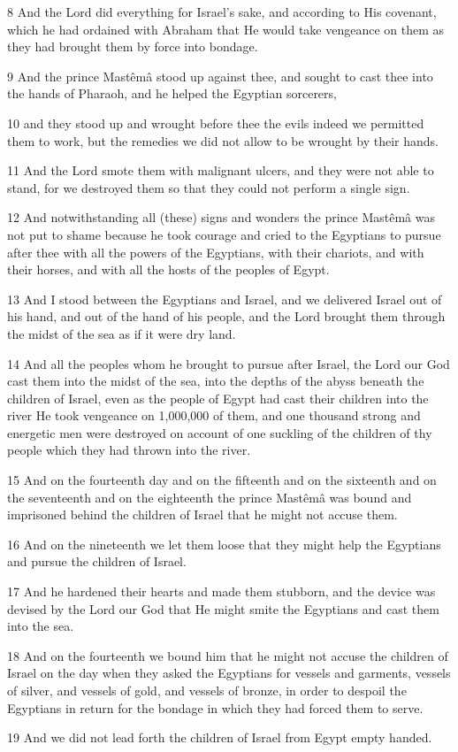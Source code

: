 \par 8 And the Lord did everything for Israel's sake, and according to His covenant, which he had ordained with Abraham that He would take vengeance on them as they had brought them by force into bondage.
\par 9 And the prince Mastêmâ stood up against thee, and sought to cast thee into the hands of Pharaoh, and he helped the Egyptian sorcerers,
\par 10 and they stood up and wrought before thee the evils indeed we permitted them to work, but the remedies we did not allow to be wrought by their hands.
\par 11 And the Lord smote them with malignant ulcers, and they were not able to stand, for we destroyed them so that they could not perform a single sign.
\par 12 And notwithstanding all (these) signs and wonders the prince Mastêmâ was not put to shame because he took courage and cried to the Egyptians to pursue after thee with all the powers of the Egyptians, with their chariots, and with their horses, and with all the hosts of the peoples of Egypt.
\par 13 And I stood between the Egyptians and Israel, and we delivered Israel out of his hand, and out of the hand of his people, and the Lord brought them through the midst of the sea as if it were dry land.
\par 14 And all the peoples whom he brought to pursue after Israel, the Lord our God cast them into the midst of the sea, into the depths of the abyss beneath the children of Israel, even as the people of Egypt had cast their children into the river He took vengeance on 1,000,000 of them, and one thousand strong and energetic men were destroyed on account of one suckling of the children of thy people which they had thrown into the river.
\par 15 And on the fourteenth day and on the fifteenth and on the sixteenth and on the seventeenth and on the eighteenth the prince Mastêmâ was bound and imprisoned behind the children of Israel that he might not accuse them.
\par 16 And on the nineteenth we let them loose that they might help the Egyptians and pursue the children of Israel.
\par 17 And he hardened their hearts and made them stubborn, and the device was devised by the Lord our God that He might smite the Egyptians and cast them into the sea.
\par 18 And on the fourteenth we bound him that he might not accuse the children of Israel on the day when they asked the Egyptians for vessels and garments, vessels of silver, and vessels of gold, and vessels of bronze, in order to despoil the Egyptians in return for the bondage in which they had forced them to serve.
\par 19 And we did not lead forth the children of Israel from Egypt empty handed.

